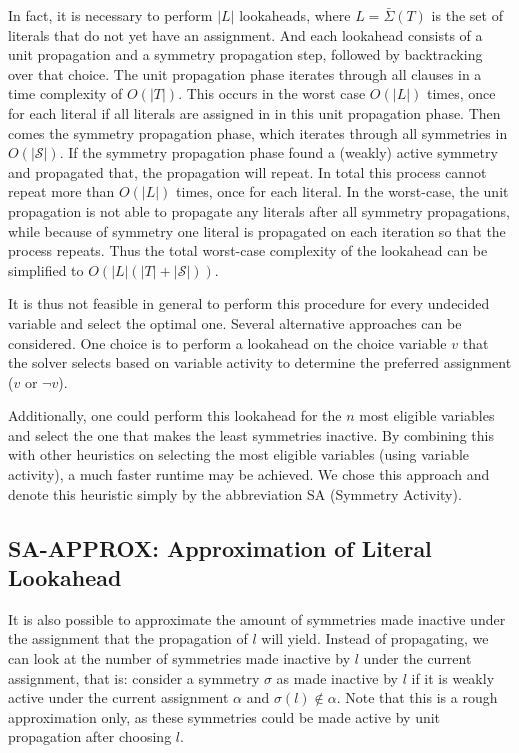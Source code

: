 	In fact, it is necessary to perform $|L|$ lookaheads, where $L = \bar{\Sigma}(T)$ is the set of
	literals that do not yet have an assignment.
	And each lookahead consists of a unit propagation and a symmetry propagation step, followed by
	backtracking over that choice.
	The unit propagation phase iterates through all clauses in a time complexity of $O(|T|)$.
	This occurs in the worst case $O(|L|)$ times,
	once for each literal if all literals are assigned in in this unit propagation phase.
	Then comes the symmetry propagation phase, which iterates through all symmetries in $O(|\mathcal{S}|)$.
	If the symmetry propagation phase found a (weakly) active symmetry and propagated that,
	the propagation will repeat.
	In total this process cannot repeat more than $O(|L|)$ times, once for each literal.
	In the worst-case, the unit propagation is not able to propagate any literals after all symmetry propagations,
	while because of symmetry one literal is propagated on each iteration so that the process repeats.
	Thus the total worst-case complexity of the lookahead can be simplified to $O(|L|(|T| + |\mathcal{S}|))$.

	It is thus not feasible in general to perform this procedure for every undecided variable and
	select the optimal one.
	Several alternative approaches can be considered.
	One choice is to perform a lookahead on the choice variable $v$ that the solver
	selects based on variable activity to determine the preferred assignment ($v$ or $\neg v$).

	Additionally, one could perform this lookahead for the $n$ most eligible variables
	and select the one that makes the least symmetries inactive.
	By combining this with other heuristics on selecting the most eligible variables (using variable
	activity), a much faster runtime may be achieved.
	We chose this approach and denote this heuristic simply by the abbreviation SA (Symmetry
	Activity).

\subsection{SA-APPROX: Approximation of Literal Lookahead}
	It is also possible to approximate the amount of symmetries made inactive under the
	assignment that the propagation of $l$ will yield.
	Instead of propagating, we can look at the number of symmetries made inactive by $l$
	under the current assignment, that is: consider a symmetry $\sigma$ as
	made inactive by $l$ if it is weakly active under the current assignment $\alpha$ and
	$\sigma(l) \notin \alpha$.
	Note that this is a rough approximation only, as these symmetries could be made active by
	unit propagation after choosing $l$.

